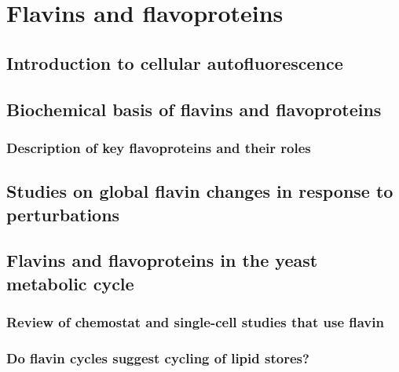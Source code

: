 \section{Flavins and flavoproteins}
\label{sec:intro-flavin}

\subsection{Introduction to cellular autofluorescence}
\label{subsec:intro-flavin-autofluo}

\subsection{Biochemical basis of flavins and flavoproteins}
\label{subsec:intro-flavin-biochem}

\subsubsection{Description of key flavoproteins and their roles}
\label{subsubsec:intro-flavin-biochem-descriptions}

\subsection{Studies on global flavin changes in response to perturbations}
\label{subsec:intro-flavin-perturbations}

\subsection{Flavins and flavoproteins in the yeast metabolic cycle}
\label{subsec:intro-flavin-ymc}

\subsubsection{Review of chemostat and single-cell studies that use flavin}
\label{subsubsec:intro-flavin-ymc-precedent}

\subsubsection{Do flavin cycles suggest cycling of lipid stores?}
\label{subsubsec:intro-flavin-ymc-lipid_cycling}

